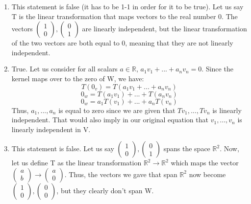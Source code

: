 \documentclass{article}
\begin{document}
\begin{enumerate}
\begin{enumerate}
\item This statement is false (it has to be 1-1 in order for it to be true). Let us say T is the linear transformation that maps vectors to the real number 0. The vectors $\left(\begin{array}{c} 1 \\ 0 \end{array}\right), \left(\begin{array}{c} 0 \\ 1 \end{array}\right)$ are linearly independent, but the linear transformation of the two vectors are both equal to 0, meaning that they are not linearly independent.

\item True. Let us consider for all scalars $a \in \mathbb{R}$, $a_1v_1 + ... + a_nv_n = 0$. Since the kernel maps over to the zero of W, we have: $$T(0_v) = T(a_1 v_1 + ... + a_n v_n)$$ $$0_w = T(a_1v_1) + ... + T(a_nv_n)$$ $$0_w = a_1T(v_1) + ... + a_nT(v_n)$$ Thus, $a_1,...,a_n$ is equal to zero since we are given that $Tv_1,...,Tv_n$ is linearly independent. That would also imply in our original equation that $v_1,...,v_n$ is linearly independent in V.

\item This statement is false. Let us say $\left(\begin{array}{c} 1 \\ 0 \end{array}\right),\left(\begin{array}{c} 0 \\ 1 \end{array}\right)$ spans the space $\mathbb{R}^2$. Now, let us define T as the linear transformation $\mathbb{R}^2 \rightarrow \mathbb{R}^2$ which maps the vector $\left(\begin{array}{c} a \\ b \end{array}\right) \rightarrow \left(\begin{array}{c} a \\ 0 \end{array}\right)$. Thus, the vectors we gave that span $\mathbb{R}^2$ now become $\left(\begin{array}{c} 1 \\ 0 \end{array}\right), \left(\begin{array}{c} 0 \\ 0 \end{array}\right)$, but they clearly don't span W.


\end{enumerate}
\end{enumerate}
\end{document}
